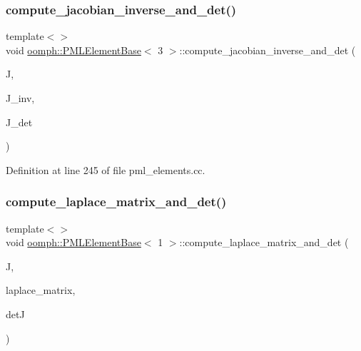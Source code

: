 \subsubsection{\texorpdfstring{compute\+\_\+jacobian\+\_\+inverse\+\_\+and\+\_\+det()}{compute\_jacobian\_inverse\_and\_det()}\hspace{0.1cm}{\footnotesize\ttfamily [4/4]}}
{\footnotesize\ttfamily template$<$$>$ \\
void \hyperlink{classoomph_1_1PMLElementBase}{oomph\+::\+P\+M\+L\+Element\+Base}$<$ 3 $>$\+::compute\+\_\+jacobian\+\_\+inverse\+\_\+and\+\_\+det (\begin{DoxyParamCaption}\item[{const \hyperlink{classoomph_1_1DiagonalComplexMatrix}{Diagonal\+Complex\+Matrix} \&}]{J,  }\item[{\hyperlink{classoomph_1_1DiagonalComplexMatrix}{Diagonal\+Complex\+Matrix} \&}]{J\+\_\+inv,  }\item[{std\+::complex$<$ double $>$ \&}]{J\+\_\+det }\end{DoxyParamCaption})}



Definition at line 245 of file pml\+\_\+elements.\+cc.

\mbox{\label{classoomph_1_1PMLElementBase_a3da41e68b3381bd895cbbb91a0e79d6a}} 
\subsubsection{\texorpdfstring{compute\+\_\+laplace\+\_\+matrix\+\_\+and\+\_\+det()}{compute\_laplace\_matrix\_and\_det()}\hspace{0.1cm}{\footnotesize\ttfamily [1/12]}}
{\footnotesize\ttfamily template$<$$>$ \\
void \hyperlink{classoomph_1_1PMLElementBase}{oomph\+::\+P\+M\+L\+Element\+Base}$<$ 1 $>$\+::compute\+\_\+laplace\+\_\+matrix\+\_\+and\+\_\+det (\begin{DoxyParamCaption}\item[{const \hyperlink{classoomph_1_1DenseComplexMatrix}{Dense\+Complex\+Matrix} \&}]{J,  }\item[{\hyperlink{classoomph_1_1DenseComplexMatrix}{Dense\+Complex\+Matrix} \&}]{laplace\+\_\+matrix,  }\item[{std\+::complex$<$ double $>$ \&}]{detJ }\end{DoxyParamCaption})}



